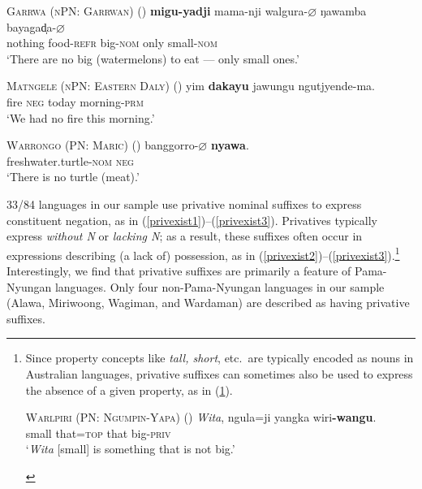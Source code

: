 \documentclass[12pt,egregdoesnotlikesansseriftitles]{scrartcl}
\begin{document}
 \begin{exe}
   \ex \textsc{Garrwa (nPN: Garrwan)} \hfill (\citealt[37]{furby77}) 
  \gll \textbf{migu-yadji}    mama-nji    walgura-$\varnothing$    ŋawamba    bayagad̩a-$\varnothing$ \\
  nothing    food-\textsc{refr}    big-\textsc{nom}    only        small-\textsc{nom} \\
  \glt `There are no big (watermelons) to eat --- only small ones.' \label{negex1}

  \ex \textsc{Matngele (nPN: Eastern Daly)} \hfill (\citealt[102]{zandvoort99})
  \gll yim \textbf{dakayu} jawungu ngutjyende-ma.\\
  fire \textsc{neg} today morning-\textsc{prm}\\
  \glt `We had no fire this morning.' \label{negex2} %
  
  \ex \textsc{Warrongo (PN: Maric)} \hfill (\citealt[660]{tsunoda11})
  \gll banggorro-$\varnothing$ \textbf{nyawa}.\\
  freshwater.turtle-\textsc{nom} \textsc{neg}\\
  \glt `There is no turtle (meat).' \label{negex3}
 \end{exe}
 
 

33/84 languages in our sample use privative nominal suffixes to express constituent negation, as in (\ref{privexist1})--(\ref{privexist3}). Privatives typically express \textit{without N} or \textit{lacking N}; as a result, these suffixes often occur in expressions describing (a lack of) possession, as in (\ref{privexist2})--(\ref{privexist3}).\footnote{Since property concepts like \textit{tall, short}, etc.\ are typically encoded as nouns in Australian languages, privative suffixes can sometimes also be used to express the absence of a given property, as in (\ref{privproperty1}).
\vspace{-2mm}
\begin{exe}
  \ex \textsc{Warlpiri (PN: Ngumpin-Yapa)} \hfill (\citealt{wdp})
  \gll \textit{Wita}, ngula=ji yangka wiri\textbf{-wangu}.\\
  small that=\textsc{top} that big-\textsc{priv}\\
  `\textit{Wita} [small] is something that is not big.'\label{privproperty1}
\end{exe}
} Interestingly, we find that privative suffixes are primarily a feature of Pama-Nyungan languages. Only four non-Pama-Nyungan languages in our sample (Alawa, Miriwoong, Wagiman, and Wardaman) are described as having privative suffixes.
\end{document}
